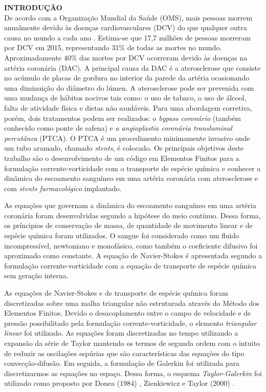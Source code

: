 \noindent\textbf{INTRODUÇÃO}
\\

De acordo com a Organização Mundial da Saúde (OMS),
mais pessoas morrem anualmente devido às doenças cardiovasculares (DCV)
do que qualquer outra causa no mundo a cada ano \cite{oms}.
Estima-se que 17,7 milhões de pessoas morreram por DCV em 2015,
representando 31\% de todas as mortes no mundo. Aproximadamente
40\% das mortes por DCV ocorreram devido às doenças na artéria coronária (DAC).
A principal causa da DAC é a aterosclerose que consiste no acúmulo 
de placas de gordura no interior da parede da artéria ocasionando
uma diminuição do diâmetro do lúmen. A aterosclerose pode ser 
prevenida com uma mudança de hábitos nocivos tais como:
o uso de tabaco, o uso de álcool, falta de atividade física
e dietas não saudáveis.
Para uma abordagem corretiva, porém, dois tratamentos podem ser
realizados: o \textit{bypass coronário} (também conhecido
como ponte de safena) e \textit{a angioplastia coronária
transluminal percutânea} (PTCA). O PTCA é um procedimento
minimamente invasivo onde um tubo aramado, chamado \textit{stents},
é colocado. Os principais objetivos deste trabalho são 
o desenvolvimento de um código em Elementos Finitos para a formulação
corrente-vorticidade com o transporte de espécie química
e conhecer a dinâmica do escoamento sanguíneo em uma artéria coronária com
aterosclerose e com \textit{stents farmacológico} implantado.

\medskip
As equações que governam a dinâmica do escoamento sanguíneo em uma
artéria coronária foram desenvolvidas segundo a hipótese do meio
contínuo. Dessa forma, os príncipios de conservação de massa,
de quantidade de movimento linear e de espécie química foram utilizados.
O sangue foi considerado como um fluido incompressível, newtoniano e monofásico,
como também o coeficiente difusivo foi aproximado como constante.
A equação de Navier-Stokes é apresentada segundo a formulação
corrente-vorticidade com a equação de transporte de espécie
química sem geração interna.

\medskip
As equações de Navier-Stokes e de transporte de espécie química
foram discretizadas sobre uma malha triangular não estruturada
através do Método dos Elementos Finitos. Devido o desacoplamento
entre o campo de velocidade e de pressão possibilitado pela formulação
corrente-vorticidade, o elemento \textit{triangular linear} foi utilizado.
As equações foram discretizadas no tempo utilizando a expansão da série de Taylor
mantendo os termos de segunda ordem com o intuito de reduzir
as oscilações espúrias que são características das equações 
do tipo convecção-difusão. Em seguida, a formulação de Galerkin foi utilizada
para discretizarmos as equações no espaço. Dessa forma,
o esquema \textit{Taylor-Galerkin} foi utilizado como proposto por Donea (1984) \cite{donea1984},
Zienkiewicz e Taylor (2000) \cite{zienkiewiczvol3}.

